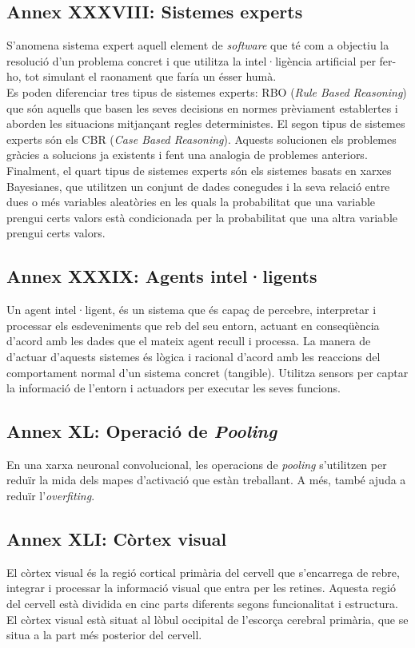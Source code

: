 \documentclass[a4paper,12pt]{article}
\begin{document}
\subsection*{Annex XXXVIII: Sistemes experts}
S'anomena sistema expert aquell element de \textit{software} que té com a objectiu la resolució d'un problema concret i que utilitza la intel·ligència artificial per fer-ho, tot simulant el raonament que faría un ésser humà.\\
Es poden diferenciar tres tipus de sistemes experts: RBO (\textit{Rule Based Reasoning}) que són aquells que basen les seves decisions en normes prèviament establertes i aborden les situacions mitjançant regles deterministes. El segon tipus de sistemes experts són els CBR (\textit{Case Based Reasoning}). Aquests solucionen els problemes gràcies a solucions ja existents i fent una analogia de problemes anteriors. Finalment, el quart tipus de sistemes experts són els sistemes basats en xarxes Bayesianes, que utilitzen un conjunt de dades conegudes i la seva relació entre dues o més variables aleatòries en les quals la probabilitat que una variable prengui certs valors està condicionada per la probabilitat que una altra variable prengui certs valors.
\subsection*{Annex XXXIX: Agents intel·ligents}
Un agent intel·ligent, és un sistema que és capaç de percebre, interpretar i processar els esdeveniments que reb del seu entorn, actuant en conseqüència d'acord amb les dades que el mateix agent recull i processa. La manera de d'actuar d'aquests sistemes és lògica i racional d'acord amb les reaccions del comportament normal d'un sistema concret (tangible). Utilitza sensors per captar la informació de l'entorn i actuadors per executar les seves funcions.
\subsection*{Annex XL: Operació de \textit{Pooling}}
En una xarxa neuronal convolucional, les operacions de \textit{pooling} s'utilitzen per reduïr la mida dels mapes d'activació que estàn treballant. A més, també ajuda a reduïr l'\textit{overfiting}.
\subsection*{Annex XLI: Còrtex visual}
El còrtex visual és la regió cortical primària del cervell que s'encarrega de rebre, integrar i processar la informació visual que entra per les retines. Aquesta regió del cervell està dividida en cinc parts diferents segons funcionalitat i estructura. El còrtex visual està situat al lòbul occipital de l'escorça cerebral primària, que se situa a la part més posterior del cervell.
\end{document}
